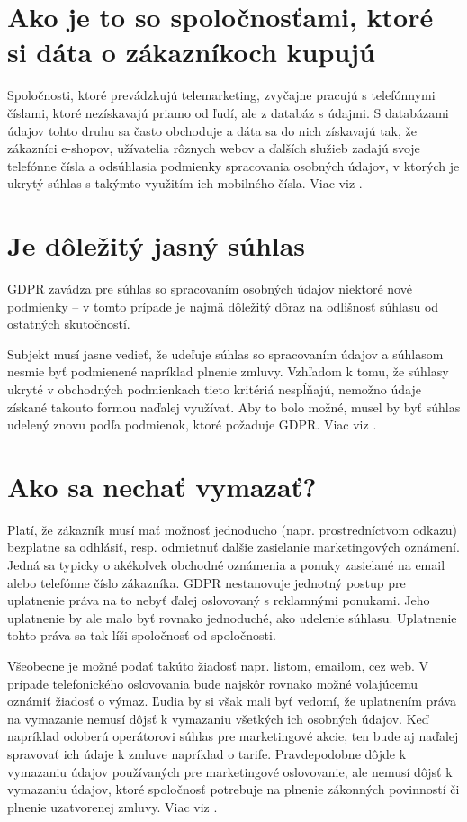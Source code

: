 \section{Ako je to so spoločnosťami, ktoré si dáta o zákazníkoch kupujú}
Spoločnosti, ktoré prevádzkujú telemarketing, zvyčajne pracujú s telefónnymi číslami, ktoré nezískavajú priamo od ľudí, ale z databáz s údajmi. S databázami údajov tohto druhu sa často obchoduje a dáta sa do nich získavajú tak, že zákazníci e-shopov, užívatelia rôznych webov a ďalších služieb zadajú svoje telefónne čísla a odsúhlasia podmienky spracovania osobných údajov, v ktorých je ukrytý súhlas s takýmto využitím ich mobilného čísla. Viac viz \cite{mobily}.
\section{Je dôležitý jasný súhlas}
GDPR zavádza pre súhlas so spracovaním osobných údajov niektoré nové podmienky – v tomto prípade je najmä dôležitý dôraz na odlišnosť súhlasu od ostatných skutočností.

Subjekt musí jasne vedieť, že udeľuje súhlas so spracovaním údajov a súhlasom nesmie byť podmienené napríklad plnenie zmluvy. Vzhľadom k tomu, že súhlasy ukryté v obchodných podmienkach tieto kritériá nespĺňajú, nemožno údaje získané takouto formou naďalej využívať. Aby to bolo možné, musel by byť súhlas udelený znovu podľa podmienok, ktoré požaduje GDPR. Viac viz \cite{mobily}.
\section{Ako sa nechať vymazať?}
Platí, že zákazník musí mať možnosť jednoducho (napr. prostredníctvom odkazu) bezplatne sa odhlásiť, resp. odmietnuť ďalšie zasielanie marketingových oznámení. Jedná sa typicky o akékoľvek obchodné oznámenia a ponuky zasielané na email alebo telefónne číslo zákazníka. GDPR nestanovuje jednotný postup pre uplatnenie práva na to nebyť ďalej oslovovaný s reklamnými ponukami. Jeho uplatnenie by ale malo byť rovnako jednoduché, ako udelenie súhlasu. Uplatnenie tohto práva sa tak líši spoločnosť od spoločnosti.

Všeobecne je možné podať takúto žiadosť napr. listom, emailom, cez web. V prípade telefonického oslovovania bude najskôr rovnako možné volajúcemu oznámiť žiadosť o výmaz. Ľudia by si však mali byť vedomí, že uplatnením práva na vymazanie nemusí dôjsť k vymazaniu všetkých ich osobných údajov. Keď napríklad odoberú operátorovi súhlas pre marketingové akcie, ten bude aj naďalej spravovať ich údaje k zmluve napríklad o tarife. Pravdepodobne dôjde k vymazaniu údajov používaných pre marketingové oslovovanie, ale nemusí dôjsť k vymazaniu údajov, ktoré spoločnosť potrebuje na plnenie zákonných povinností či plnenie uzatvorenej zmluvy. Viac viz \cite{mobily}.
